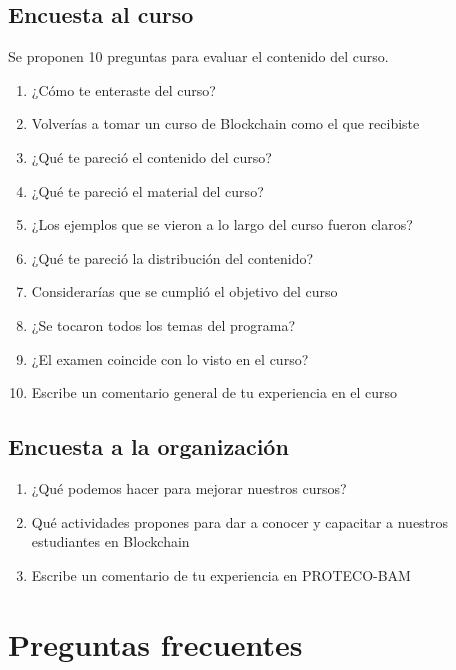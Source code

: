 \documentclass[a4paper,12pt]{/home/armando/Documentos/Cursos/LaTeX/Plantillas/lib/pub}
\begin{document}
	\subsection{Encuesta al curso}
	Se proponen 10 preguntas para evaluar el contenido del curso.
	\begin{enumerate}
		\item ¿Cómo te enteraste del curso?
		\item Volverías a tomar un curso de Blockchain como el que recibiste
		\item ¿Qué te pareció el contenido del curso?
		\item ¿Qué te pareció el material del curso?
		\item ¿Los ejemplos que se vieron a lo largo del curso fueron claros?
		\item ¿Qué te pareció la distribución del contenido?
		\item Considerarías que se cumplió el objetivo del curso
		\item ¿Se tocaron todos los temas del programa?
		\item ¿El examen coincide con lo visto en el curso?
		\item Escribe un comentario general de tu experiencia en el curso
	\end{enumerate}
	
	\subsection{Encuesta a la organización}
	\begin{enumerate}
		\item ¿Qué podemos hacer para mejorar nuestros cursos?
		\item Qué actividades propones para dar a conocer y capacitar a nuestros estudiantes en Blockchain
		\item Escribe un comentario de tu experiencia en PROTECO-BAM
	\end{enumerate}

\section{Preguntas frecuentes}
\end{document}
